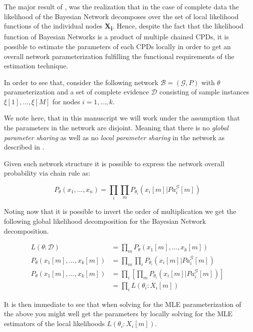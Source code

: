 \documentclass[11pt]{article}
\begin{document}
\begin{article}
The major result of \cite{spiegelhalter1990sequential}, was the
realization that in the case of complete data the likelihood of the
Bayesian Network decomposes over the set of local likelihood
functions of the individual nodes \textbf{X\textsubscript{i}}. Hence, despite the fact
that the likelihood function of Bayesian Networks is a product of
multiple chained CPDs, it is possible to estimate the parameters of
each CPDs locally in order to get an overall network
parameterization fulfilling the functional requirements of the
estimation technique.

In order to see that, consider the following network \(\mathscr{B} =
  (\mathscr{G}, P)\) with \(\theta\) parameterization and a set of complete
evidence \(\mathscr{D}\) consisting of sample instances \(\xi[1], ...,
  \xi[M]\) for nodes \(i = 1, ..., k\).

We note here, that in this manuscript we will work under the
assumption that the parameters in the network are disjoint. Meaning
that there is no \emph{global parameter sharing} as well as no \emph{local
parameter sharing} in the network as described in
\cite{koller2009probabilistic}.

Given such network structure it is possible to express the network
overall probability via chain rule as:

\begin{equation} \label{eq:global_decomposition}
P_{\theta} (x_1, ..., x_n) = \prod_i \prod_m P_{\theta_i}(x_i[m] | Pa_i^{\mathscr{G}}[m])  \nonumber
\end{equation}

Noting now that it is possible to invert the order of multiplication
we get the following global likelihood decomposition for the
Bayesian Network decomposition. 

\begin{align} \label{eq:global_decomposition}
L(\theta : \mathscr{D})       &= \prod_m P_{\theta} (x_1[m], ..., x_k[m]) \nonumber \\ 
P_{\theta} (x_1[m], ..., x_k[m]) &= \prod_m \prod_i  P_{\theta_i}(x_i[m] | Pa_i^{\mathscr{G}}[m])  \nonumber \\
P_{\theta} (x_1[m], ..., x_k[m]) &= \prod_i [\prod_m  P_{\theta_i}(x_i[m] | Pa_i^{\mathscr{G}}[m])]  \nonumber \\
                              &= \prod_i L(\theta_i : X_i[m])  \nonumber    
\end{align}

It is then immediate to see that when solving for the MLE
parameterization of the above you might well get the parameters by
locally solving for the MLE estimators of the local likelihoods
\(L(\theta_i : X_i[m])\).


\end{article}
\end{document}
